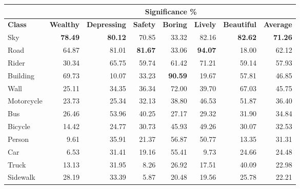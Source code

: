 \begin{table}[H]
	\begin{tabular}{|l|rrrrrrr|}
		\hline
					& \multicolumn{7}{c|}{\textbf{Significance \%}} \\ \hline
		\textbf{Class} & \textbf{Wealthy} & \textbf{Depressing} & \textbf{Safety} & \textbf{Boring} & \textbf{Lively} & \textbf{Beautiful} & \textbf{Average} \\
		\hline
		Sky            & \textbf{78.49}   & \textbf{80.12}      & 70.85           & 33.32           & 82.16           & \textbf{82.62}     & \textbf{71.26}   \\
		Road           & 64.87            & 81.01               & \textbf{81.67}  & 33.06           & \textbf{94.07}  & 18.00              & 62.12            \\
		Rider          & 30.34            & 65.75               & 59.74           & 61.42           & 71.21           & 59.14              & 57.93            \\
		Building       & 69.73            & 10.07               & 33.23           & \textbf{90.59}  & 19.67           & 57.81              & 46.85            \\
		Wall           & 25.11            & 34.35               & 36.34           & 72.00           & 39.70           & 67.03              & 45.75            \\
		Motorcycle     & 23.73            & 25.34               & 32.13           & 38.80           & 46.53           & 51.87              & 36.40            \\
		Bus            & 26.46            & 53.96               & 40.25           & 27.17           & 29.32           & 31.90              & 34.84            \\
		Bicycle        & 14.42            & 24.77               & 30.73           & 45.93           & 49.26           & 30.07              & 32.53            \\
		Person         & 9.61             & 35.91               & 21.37           & 56.87           & 50.77           & 13.35              & 31.31            \\
		Car            & 6.53             & 31.41               & 19.16           & 55.41           & 9.73            & 24.66              & 24.48            \\
		Truck          & 13.13            & 31.95               & 8.26            & 26.92           & 17.51           & 40.09              & 22.98            \\
		Sidewalk       & 28.19            & 33.39               & 5.87            & 20.48           & 19.56           & 25.78              & 22.21            \\

\end{tabular}
\end{table}
